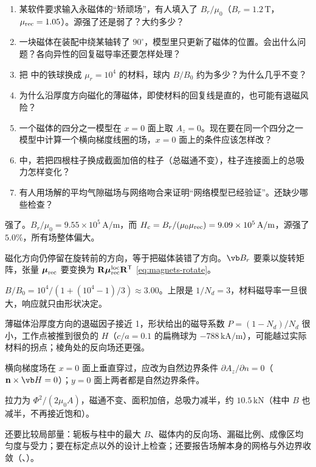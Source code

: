 \begin{selfcheck}
\begin{enumerate}
\item 某软件要求输入永磁体的“矫顽场”，有人填入了 $B_r/\mu_0$（$B_r=1.2\,\mathrm T$，$\mu_{\rm rec}=1.05$）。源强了还是弱了？大约多少？
\item 一块磁体在装配中绕某轴转了 $90^\circ$，模型里只更新了磁体的位置。会出什么问题？各向异性的回复磁导率还要怎样处理？
\item 把 中的铁球换成 $\mu_r=10^4$ 的材料，球内 $B/B_0$ 约为多少？为什么几乎不变？
\item 为什么沿厚度方向磁化的薄磁体，即使材料的回复线是直的，也可能有退磁风险？
\item 一个磁体的四分之一模型在 $x=0$ 面上取 $A_z=0$。现在要在同一个四分之一模型中计算一个横向梯度线圈的场，$x=0$ 面上的条件应该怎样改？
\item {} 中，若把四根柱子换成截面加倍的柱子（总磁通不变），柱子连接面上的总吸力怎样变化？
\item 有人用场解的平均气隙磁场与网络吻合来证明“网络模型已经验证”。还缺少哪些检查？
\end{enumerate}
\end{selfcheck}

\begin{answers}
\item 强了。$B_r/\mu_0=9.55\times10^5\,\mathrm{A/m}$，而 $H_c=B_r/(\mu_0\mu_{\rm rec})=9.09\times10^5\,\mathrm{A/m}$，源强了 $5.0\%$，所有场整体偏大。
\item 磁化方向仍停留在旋转前的方向，等于把磁体装错了方向。$\vb B_r$ 要乘以旋转矩阵，张量 $\boldsymbol\mu_{\rm rec}$ 要变换为 $\mathbf R\boldsymbol\mu_{\rm rec}^{\rm loc}\mathbf R^{\mathsf T}$ \eqref{eq:magnets-rotate}。
\item $B/B_0=10^4/(1+(10^4-1)/3)\approx3.00$。上限是 $1/N_d=3$，材料磁导率一旦很大，响应就只由形状决定。
\item 薄磁体沿厚度方向的退磁因子接近 1，形状给出的磁导系数 $P=(1-N_d)/N_d$ 很小，工作点被推到很负的 $H$（$c/a=0.1$ 的扁椭球为 $-788\,\mathrm{kA/m}$），可能越过实际材料的拐点；棱角处的反向场还更强。
\item 横向梯度场在 $x=0$ 面上垂直穿过，应改为自然边界条件 $\partial A_z/\partial n=0$（$\mathbf n\times\vb H=0$）；$y=0$ 面上两者都是自然边界条件。
\item 拉力为 $\Phi^2/(2\mu_0A)$，磁通不变、面积加倍，总吸力减半，约 $10.5\,\mathrm{kN}$（柱中 $B$ 也减半，不再接近饱和）。
\item 还要比较局部量：轭板与柱中的最大 $B$、磁体内的反向场、漏磁比例、成像区均匀度与受力；要在标定点以外的设计上检查；还要报告场解本身的网格与外边界收敛（、）。
\end{answers}
